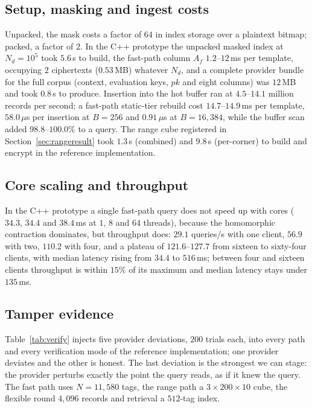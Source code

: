 \documentclass[a4paper,fleqn]{cas-sc}
\newif\ifauthorchecks
\newcommand{\authorcheck}[1]{\ifauthorchecks{\color{red}\textsf{[Authors: #1]}}\fi}
\begin{document}
\subsection{Setup, masking and ingest costs}
\label{sec:setupresult}
Unpacked, the mask costs a factor of $64$ in index storage over a plaintext
bitmap; packed, a factor of $2$. In the C++ prototype the unpacked masked index
at $N_d=10^5$ took $5.6$\,s to build, the fast-path column $A_f$ $1.2$--$12$\,ms
per template, occupying $2$ ciphertexts ($0.53$\,MB) whatever $N_d$, and a
complete provider bundle for the full corpus (context, evaluation keys, $pk$
and eight columns) was $12$\,MB and took $0.8$\,s to produce. Insertion into the hot
buffer ran at $4.5$--$14.1$ million records per second; a fast-path static-tier
rebuild cost $14.7$--$14.9$\,ms per template, $58.0\,\mu$s per insertion at
$B=256$ and $0.91\,\mu$s at $B=16{,}384$, while the buffer scan added
$98.8$--$100.0\%$ to a query. The range cube registered in
Section~\ref{sec:rangeresult} took $1.3$\,s (combined) and $9.8$\,s
(per-corner) to build and encrypt in the reference implementation.
\authorcheck{Re-measure the masked-index build with rejection sampling and
packing in C++.}


\subsection{Core scaling and throughput}
\label{sec:scaling}
In the C++ prototype a single fast-path query does not speed up with cores
($34.3$, $34.4$ and $38.4$\,ms at $1$, $8$ and $64$ threads), because the
homomorphic contraction dominates, but throughput does: $29.1$ queries/s with
one client, $56.9$ with two, $110.2$ with four, and a plateau of
$121.6$--$127.7$ from sixteen to sixty-four clients, with median latency rising
from $34.4$ to $516$\,ms; between four and sixteen clients throughput is within
$15\%$ of its maximum and median latency stays under $135$\,ms.

\subsection{Tamper evidence}
\label{sec:verifyresult}
Table~\ref{tab:verify} injects five provider deviations, $200$ trials each, into
every path and every verification mode of the reference implementation; one
provider deviates and the other is honest. The last deviation is the strongest
we can stage: the provider perturbs exactly the point the query reads, as if it
knew the query. The fast path uses $N=11{,}580$ tags, the range path a
$3\times200\times10$ cube, the flexible round $4{,}096$ records and retrieval a
$512$-tag index.
\end{document}
